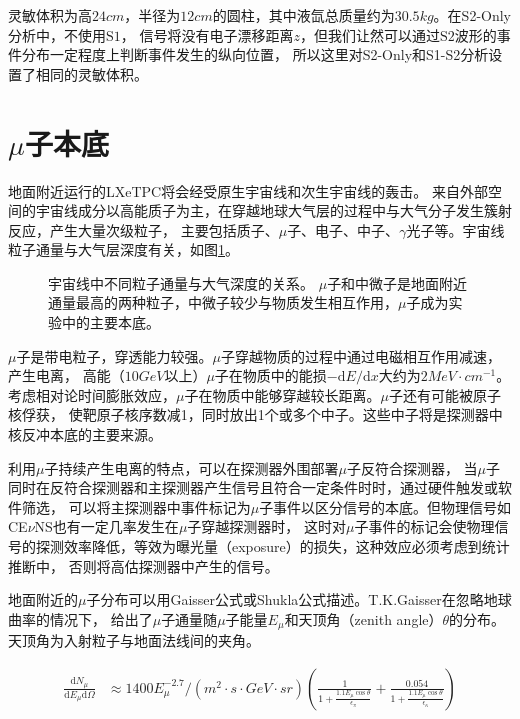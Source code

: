 灵敏体积为高$24\si{cm}$，半径为$12\si{cm}$的圆柱，其中液氙总质量约为$30.5\si{kg}$。在S2-Only分析中，不使用$\mathrm{S1}$，
信号将没有电子漂移距离$z$，但我们让然可以通过$\mathrm{S2}$波形的事件分布一定程度上判断事件发生的纵向位置，
所以这里对S2-Only和S1-S2分析设置了相同的灵敏体积。

\section{$\mu$子本底}

地面附近运行的LXeTPC将会经受原生宇宙线和次生宇宙线的轰击。
来自外部空间的宇宙线成分以高能质子为主，在穿越地球大气层的过程中与大气分子发生簇射反应，产生大量次级粒子，
主要包括质子、$\mu$子、电子、中子、$\gamma$光子等。宇宙线粒子通量与大气层深度有关，如图\ref{fig:vertical_flux}。

\begin{figure}
    \centering
    
    \caption{\label{fig:vertical_flux} 宇宙线中不同粒子通量与大气深度的关系\cite{olive_review_2016}。
    $\mu$子和中微子是地面附近通量最高的两种粒子，中微子较少与物质发生相互作用，$\mu$子成为实验中的主要本底。}
\end{figure}

$\mu$子是带电粒子，穿透能力较强。$\mu$子穿越物质的过程中通过电磁相互作用减速，产生电离，
高能（$10\si{GeV}$以上）$\mu$子在物质中的能损$-\mathrm{d}E/\mathrm{d}x$大约为$2\si{MeV\cdot cm^{-1}}$。
考虑相对论时间膨胀效应，$\mu$子在物质中能够穿越较长距离。$\mu$子还有可能被原子核俘获，
使靶原子核序数减1，同时放出1个或多个中子。这些中子将是探测器中核反冲本底的主要来源。

利用$\mu$子持续产生电离的特点，可以在探测器外围部署$\mu$子反符合探测器，
当$\mu$子同时在反符合探测器和主探测器产生信号且符合一定条件时时，通过硬件触发或软件筛选，
可以将主探测器中事件标记为$\mu$子事件以区分信号的本底。但物理信号如CE$\nu$NS也有一定几率发生在$\mu$子穿越探测器时，
这时对$\mu$子事件的标记会使物理信号的探测效率降低，等效为曝光量（exposure）的损失，这种效应必须考虑到统计推断中，
否则将高估探测器中产生的信号。

地面附近的$\mu$子分布可以用Gaisser公式或Shukla公式描述。T.K.Gaisser在忽略地球曲率的情况下，
给出了$\mu$子通量随$\mu$子能量$E_\mu$和天顶角（zenith angle）$\theta$的分布。天顶角为入射粒子与地面法线间的夹角\cite{gaisser_cosmic_2016}。

\begin{align}
    \label{eq:gaisser}
    \frac{\mathrm{d}N_\mu}{\mathrm{d}E_\mu\mathrm{d}\Omega} &\approx 
    1400E_\mu^{-2.7}/\left(\si{m^2\cdot s\cdot GeV\cdot sr}\right)\left(\frac{1}{1+\frac{1.1E_\mu\cos\theta}{\epsilon_\pi}}+\frac{0.054}{1+\frac{1.1E_\mu\cos\theta}{\epsilon_\kappa}}\right)
\end{align}

